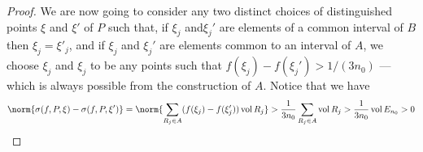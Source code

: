 \begin{proof}
We are now going to consider any two distinct choices of distinguished points
\(\xi\) and \(\xi'\) of \(P\) such that, if \(\xi_j\) and\(\xi_j'\) are elements
of a common interval of \(B\) then \(\xi_j = \xi'_j\), and if \(\xi_j\) and
\(\xi_j'\) are elements common to an interval of \(A\), we choose \(\xi_j\) and
\(\xi_j\) to be any points such that \(f(\xi_j) - f(\xi_j') > 1/(3n_0)\) ---
which is always possible from the construction of \(A\). Notice that we have
\[
  \norm{\sigma(f, P, \xi) - \sigma(f, P, \xi')}
  = \norm{\sum_{R_{j} \in A} (f(\xi_j) - f(\xi_j')) \Vol R_j}
  > \frac 1 {3 n_0} \sum_{R_j \in A} \Vol R_j
  > \frac 1 {3 n_0} \Vol E_{n_0} > 0
\]
\end{proof}

